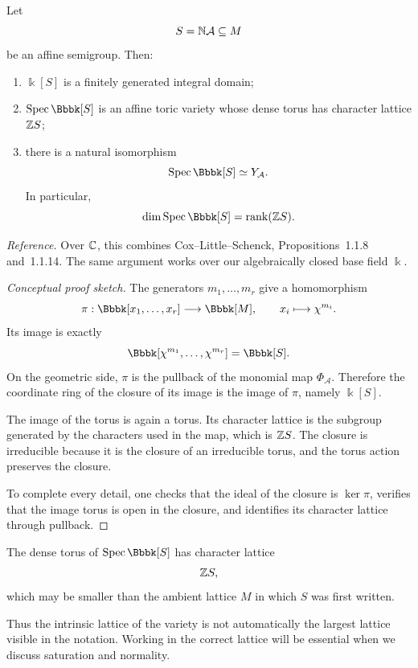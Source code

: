 \begin{proposition}
\label{prop:semigroup-algebra-monomial-closure}
Let
\[
S=\mathbb{N}\mathcal A\subseteq M
\]
be an affine semigroup. Then:
\begin{enumerate}[label=(\alph*),wide=0pt]
\item \(\Bbbk[S]\) is a finitely generated integral domain;
\item \(\Spec\Bbbk[S]\) is an affine toric variety whose dense torus
has character lattice \(\mathbb{Z} S\);
\item there is a natural isomorphism
\[
\Spec\Bbbk[S]\simeq Y_{\mathcal A}.
\]
In particular,
\[
\dim\Spec\Bbbk[S]
=
\rank(\ZZ S).
\]
\end{enumerate}
\end{proposition}

\noindent
\textit{Reference.}
Over \(\mathbb{C}\), this combines Cox--Little--Schenck,
Propositions~1.1.8 and~1.1.14. The same argument works over our
algebraically closed base field \(\Bbbk\).

\begin{proof}[Conceptual proof sketch]
The generators \(m_1,\ldots,m_r\) give a homomorphism
\[
\pi:
\Bbbk[x_1,\ldots,x_r]
\longrightarrow
\Bbbk[M],
\qquad
x_i\longmapsto\character{m_i}.
\]
Its image is exactly
\[
\Bbbk[
\character{m_1},\ldots,\character{m_r}
]
=
\Bbbk[S].
\]
On the geometric side, \(\pi\) is the pullback of the monomial map
\(\Phi_{\mathcal A}\). Therefore the coordinate ring of the closure
of its image is the image of \(\pi\), namely \(\Bbbk[S]\).

The image of the torus is again a torus. Its character lattice is the
subgroup generated by the characters used in the map, which is
\(\mathbb{Z} S\). The closure is irreducible because it is the closure of an
irreducible torus, and the torus action preserves the closure.

To complete every detail, one checks that the ideal of the closure is
\(\ker\pi\), verifies that the image torus is open in the closure, and
identifies its character lattice through pullback.
\end{proof}

\begin{warningbox}
The dense torus of \(\Spec\Bbbk[S]\) has character lattice
\[
\mathbb{Z} S,
\]
which may be smaller than the ambient lattice \(M\) in which \(S\) was
first written.

Thus the intrinsic lattice of the variety is not automatically the
largest lattice visible in the notation. Working in the correct
lattice will be essential when we discuss saturation and normality.
\end{warningbox}

